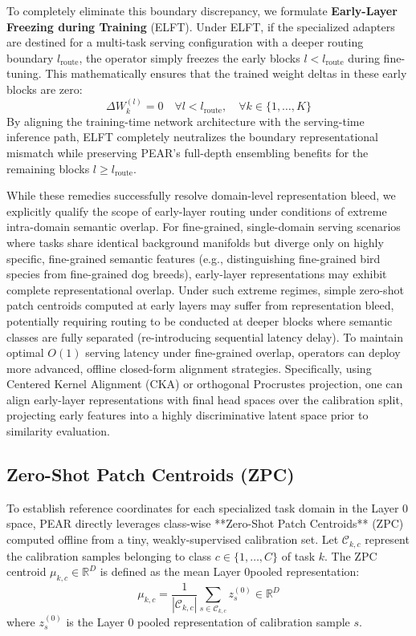 To completely eliminate this boundary discrepancy, we formulate \textbf{Early-Layer Freezing during Training} (ELFT). Under ELFT, if the specialized adapters are destined for a multi-task serving configuration with a deeper routing boundary $l_{\text{route}}$, the operator simply freezes the early blocks $l < l_{\text{route}}$ during fine-tuning. This mathematically ensures that the trained weight deltas in these early blocks are zero:
\begin{equation}
    \Delta W_k^{(l)} = 0 \quad \forall l < l_{\text{route}}, \quad \forall k \in \{1, \dots, K\}
\end{equation}
By aligning the training-time network architecture with the serving-time inference path, ELFT completely neutralizes the boundary representational mismatch while preserving PEAR's full-depth ensembling benefits for the remaining blocks $l \geq l_{\text{route}}$.

While these remedies successfully resolve domain-level representation bleed, we explicitly qualify the scope of early-layer routing under conditions of extreme intra-domain semantic overlap. For fine-grained, single-domain serving scenarios where tasks share identical background manifolds but diverge only on highly specific, fine-grained semantic features (e.g., distinguishing fine-grained bird species from fine-grained dog breeds), early-layer representations may exhibit complete representational overlap. Under such extreme regimes, simple zero-shot patch centroids computed at early layers may suffer from representation bleed, potentially requiring routing to be conducted at deeper blocks where semantic classes are fully separated (re-introducing sequential latency delay). To maintain optimal $O(1)$ serving latency under fine-grained overlap, operators can deploy more advanced, offline closed-form alignment strategies. Specifically, using Centered Kernel Alignment (CKA) or orthogonal Procrustes projection, one can align early-layer representations with final head spaces over the calibration split, projecting early features into a highly discriminative latent space prior to similarity evaluation.

\subsection{Zero-Shot Patch Centroids (ZPC)}
To establish reference coordinates for each specialized task domain in the Layer 0 space, PEAR directly leverages class-wise **Zero-Shot Patch Centroids** (ZPC) computed offline from a tiny, weakly-supervised calibration set. Let $\mathcal{C}_{k, c}$ represent the calibration samples belonging to class $c \in \{1, \dots, C\}$ of task $k$. The ZPC centroid $\mu_{k, c} \in \mathbb{R}^D$ is defined as the mean Layer 0pooled representation:
\begin{equation}
    \mu_{k, c} = \frac{1}{|\mathcal{C}_{k, c}|} \sum_{s \in \mathcal{C}_{k, c}} z_s^{(0)} \in \mathbb{R}^D
\end{equation}
where $z_s^{(0)}$ is the Layer 0 pooled representation of calibration sample $s$. 


